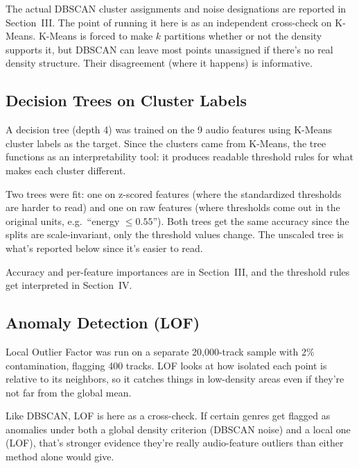 \documentclass[10pt,twocolumn]{article}
\begin{document}
The actual DBSCAN cluster assignments and noise designations are reported in Section~III. The point of running it here is as an independent cross-check on K-Means. K-Means is forced to make $k$ partitions whether or not the density supports it, but DBSCAN can leave most points unassigned if there's no real density structure. Their disagreement (where it happens) is informative.

\subsection{Decision Trees on Cluster Labels}

A decision tree (depth 4) was trained on the 9 audio features using K-Means cluster labels as the target. Since the clusters came from K-Means, the tree functions as an interpretability tool: it produces readable threshold rules for what makes each cluster different.

Two trees were fit: one on z-scored features (where the standardized thresholds are harder to read) and one on raw features (where thresholds come out in the original units, e.g.\ ``energy $\leq 0.55$''). Both trees get the same accuracy since the splits are scale-invariant, only the threshold values change. The unscaled tree is what's reported below since it's easier to read.

Accuracy and per-feature importances are in Section~III, and the threshold rules get interpreted in Section~IV.

\subsection{Anomaly Detection (LOF)}

Local Outlier Factor was run on a separate 20,000-track sample with 2\% contamination, flagging 400 tracks. LOF looks at how isolated each point is relative to its neighbors, so it catches things in low-density areas even if they're not far from the global mean.

Like DBSCAN, LOF is here as a cross-check. If certain genres get flagged as anomalies under both a global density criterion (DBSCAN noise) and a local one (LOF), that's stronger evidence they're really audio-feature outliers than either method alone would give.
\end{document}

